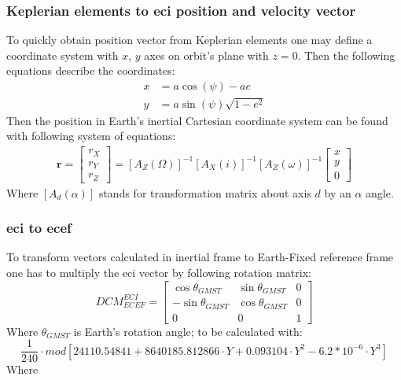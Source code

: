        \subsubsection{Keplerian elements to \ac{eci} position and velocity vector}
            To quickly obtain position vector from Keplerian elements one may define a coordinate system with $x$, $y$ axes on orbit's plane with $z=0$. Then the following equations describe the coordinates:
            \begin{align}
                x & = a\cos(\psi) -ae \\
                y &= a\sin(\psi)\sqrt{1-e^2}
            \end{align}
            Then the position in Earth's inertial Cartesian coordinate system can be found with following system of equations:
            \begin{align}
                \textbf{r} = \begin{bmatrix} r_X\\ r_Y\\ r_Z \end{bmatrix} = [A_Z(\Omega)]^{-1} [A_X(i)]^{-1} [A_Z(\omega)]^{-1} \begin{bmatrix} x\\ y\\ 0 \end{bmatrix}
            \end{align}
            Where $[A_d(\alpha)]$ stands for transformation matrix about axis $d$ by an $\alpha$ angle.


        \subsubsection{\ac{eci} to \ac{ecef}}
            To transform vectors calculated in inertial frame to Earth-Fixed reference frame one has to multiply the \ac{eci} vector by following rotation matrix:
            \begin{equation}
                DCM^{ECI}_{ECEF} = \begin{bmatrix} \cos\theta_{GMST} & \sin\theta_{GMST} & 0\\
                -\sin\theta_{GMST} & \cos\theta_{GMST} & 0 \\
                0 & 0 & 1 \end{bmatrix}
            \end{equation}
            Where $\theta_{GMST}$ is Earth's rotation angle; to be calculated with:
            \begin{equation}
                \frac{1}{240}\cdot mod\left[ 24110.54841 + 8640185.812866 \cdot Y + 0.093104 \cdot Y^2 - 6.2*10^{-6} \cdot Y^3 \right]
            \end{equation}
            Where 

